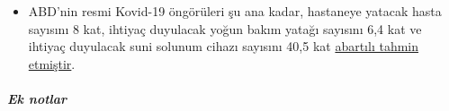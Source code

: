 \begin{itemize}
{  Kore'li doktorların bildirdiğine göre}, durumu kritik olan Kovid-19
  hastaları, bir suni solunum cihazı olmaksızın yapılan, oksijen
  tedavisine iyi cevap veriyor. Yukarda söz edilen Amerikalı doktor, ek
  akciğer tahribatına yol açmamak için, suni solunum cihazı kullanımının
  acilen yeniden gözden geçirilmesi gerektiği konusunda uyarıda
  bulunuyor.
\item
  ABD'nin resmi Kovid-19 öngörüleri şu ana kadar, hastaneye yatacak
  hasta sayısını 8 kat, ihtiyaç duyulacak yoğun bakım yatağı sayısını
  6,4 kat ve ihtiyaç duyulacak suni solunum cihazı sayısını 40,5 kat
  \href{https://twitter.com/NikolovScience/status/1246823479820693505}{abartılı
  tahmin etmiştir}.
\end{itemize}

\hypertarget{ek-notlar}{%
\subparagraph{\texorpdfstring{\textbf{Ek
notlar}}{Ek notlar}}\label{ek-notlar}}

